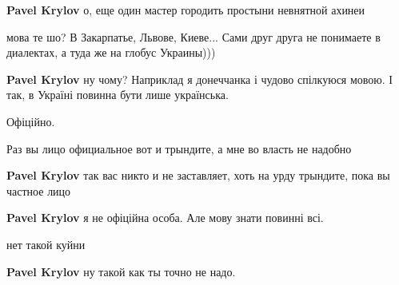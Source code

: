 \begin{itemize}
\begin{itemize}
\textbf{Pavel Krylov} о, еще один мастер городить простыни невнятной ахинеи

 
мова те шо? В Закарпатье, Львове, Киеве... Сами друг друга не понимаете в диалектах, а туда же на глобус Украины)))

 

\textbf{Pavel Krylov} ну чому? Наприклад я донеччанка і чудово спілкуюся мовою.
І так, в Україні повинна бути лише українська.

Офіційно.

 
Раз вы лицо официальное вот и трындите, а мне во власть не надобно

 
\textbf{Pavel Krylov} так вас никто и не заставляет, хоть на урду трындите, пока вы частное лицо

 
\textbf{Pavel Krylov} я не офіційна особа. Але мову знати повинні всі.

 
нет такой куйни

 
\textbf{Pavel Krylov} ну такой как ты точно не надо.

 

\end{itemize}
\end{itemize}
